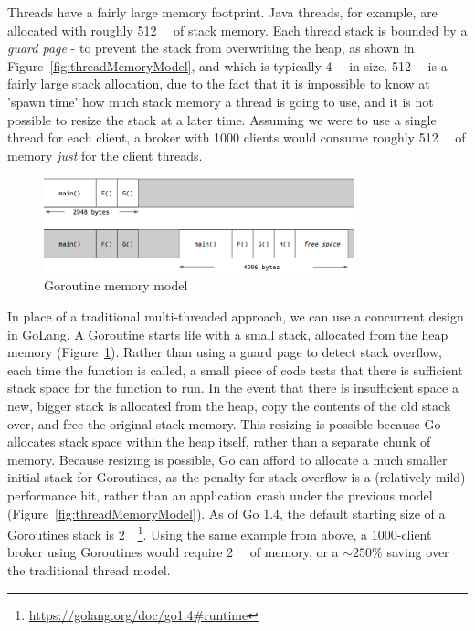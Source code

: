 Threads have a fairly large memory footprint. Java threads, for example, are
allocated with roughly \SI{512}{\kibi\byte} of stack memory. Each thread stack
is bounded by a \emph{guard page} - to prevent the stack from overwriting the
heap, as shown in Figure~\ref{fig:threadMemoryModel}, and which is typically
\SI{4}{\kibi\byte} in size. \SI{512}{\kibi\byte} is a fairly large stack
allocation, due to the fact that it is impossible to know at 'spawn time' how
much stack memory a thread is going to use, and it is not possible to resize the
stack at a later time. Assuming we were to use a single thread for each client,
a broker with 1000 clients would consume roughly \SI{512}{\mebi\byte} of memory
\emph{just} for the client threads.

\begin{figure}[H]
  \centering
  \includegraphics[width=0.8\textwidth]{figures/stack-growth}
  \caption{Goroutine memory model \cite{performanceWithoutTheEventLoop}}
  \label{fig:goMemoryModel}
\end{figure}

In place of a traditional multi-threaded approach, we can use a concurrent
design in GoLang. A Goroutine starts life with a small stack, allocated from the
heap memory (Figure~\ref{fig:goMemoryModel}). Rather than using a guard page to
detect stack overflow, each time the function is called, a small piece of code
tests that there is sufficient stack space for the function to run. In the event
that there is insufficient space a new, bigger stack is allocated from the heap,
copy the contents of the old stack over, and free the original stack memory.
This resizing is possible because Go allocates stack space within the heap
itself, rather than a separate chunk of memory. Because resizing is possible, Go
can afford to allocate a much smaller initial stack for Goroutines, as the
penalty for stack overflow is a (relatively mild) performance hit, rather than
an application crash under the previous model
(Figure~\ref{fig:threadMemoryModel}). As of Go 1.4, the default starting size of
a Goroutines stack is
\SI{2}{\kibi\byte}\footnote{\url{https://golang.org/doc/go1.4\#runtime}}. Using
the same example from above, a 1000-client broker using Goroutines would require
\SI{2}{\mebi\byte} of memory, or a $\sim250\%$ saving over the traditional
thread model.

